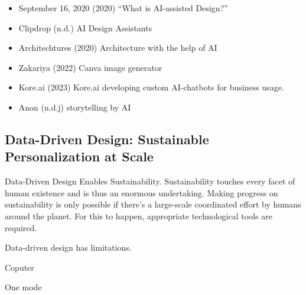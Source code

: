 \documentclass[
  letterpaper,
  DIV=11,
  numbers=noendperiod]{scrartcl}
\providecommand{\tightlist}{%
  \setlength{\itemsep}{0pt}\setlength{\parskip}{0pt}}\usepackage{longtable,booktabs,array}
\begin{document}
\begin{itemize}
\tightlist
\item
  September 16, 2020 (2020) ``What is AI-assisted Design?''
\item
  Clipdrop (n.d.) AI Design Assistants
\item
  Architechtures (2020) Architecture with the help of AI
\item
  Zakariya (2022) Canva image generator
\item
  Kore.ai (2023) Kore.ai developing custom AI-chatbots for business
  usage.
\item
  Anon (n.d.j) storytelling by AI
\end{itemize}

\subsection{Data-Driven Design: Sustainable Personalization at
Scale}\label{data-driven-design-sustainable-personalization-at-scale}

Data-Driven Design Enables Sustainability. Sustainability touches every
facet of human existence and is thus an enormous undertaking. Making
progress on sustainability is only possible if there's a large-scale
coordinated effort by humans around the planet. For this to happen,
appropriate technological tools are required.

Data-driven design has limitations.

Coputer

One mode
\end{document}
